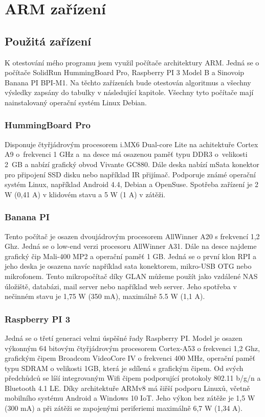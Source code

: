 \section{ARM zařízení}
\subsection{Použitá zařízení}
K otestování mého programu jsem využil počítače architektury ARM. Jedná se o počítače SolidRun HummingBoard Pro, Raspberry PI 3 Model B a Sinovoip Banana PI BPI-M1. Na těchto zařízeních bude otestován algoritmus a všechny výsledky zapsány do tabulky v následující kapitole. Všechny tyto počítače mají nainstalovaný operační systém Linux Debian.

\subsubsection*{HummingBoard Pro}
 Disponuje čtyřjádrovým procesorem i.MX6 Dual-core Lite na achitektuře Cortex A9 o~frekvenci 1 GHz a~na desce má osazenou paměť typu DDR3 o~velikosti 2~GB a nabízí grafický obvod Vivante GC880. Dále deska nabízí mSata konektor pro připojení SSD disku nebo například IR přijímač. Podporuje známé operační systém Linux, například Android 4.4, Debian a OpenSuse. Spotřeba zařízení je 2 W (0,41 A) v klidovém stavu a 5 W (1 A) v zátěži.

\subsubsection*{Banana PI}
Tento počítač je osazen dvoujádrovým procesorem AllWinner A20 s frekvencí 1,2 Ghz. Jedná se o low-end verzi procesoru AllWinner A31. Dále na desce najdeme grafický čip Mali-400 MP2 a operační paměť 1 GB. Jedná se o první klon RPI a jeho deska je osazena navíc například sata konektorem, mikro-USB OTG nebo mikrofonem. Tento mikropočítač díky GLAN můžeme použít jako vzdálené NAS úložiště, databázi, mail server nebo například web server. Jeho spotřeba v nečinném stavu je 1,75 W (350 mA), maximálně 5.5 W (1,1 A).

\subsubsection*{Raspberry PI 3}
Jedná se o třetí generaci velmi úspěšné řady Raspberry PI. Model je osazen výkonným 64 bitovým čtyřjádrovým procesorem Cortex-A53 o frekvenci 1,2 Ghz, grafickým čipem Broadcom VideoCore IV o frekvenci 400 MHz, operační paměť typu SDRAM o velikosti 1GB, která je sdílená s grafickým čipem. Od svých předchůdců se líší integrovaným Wifi čipem podporující protokoly 802.11 b/g/n a Bluetooth 4.1 LE. Díky architektuře ARMv8 má šiřší podporu Linuxů, včetně mobilního systému Android a Windows 10 IoT. Jeho výkon bez zátěže je 1,5 W (300 mA) a při zátěži se zapojenými periferiemi maximálně 6,7 W (1,34 A).

